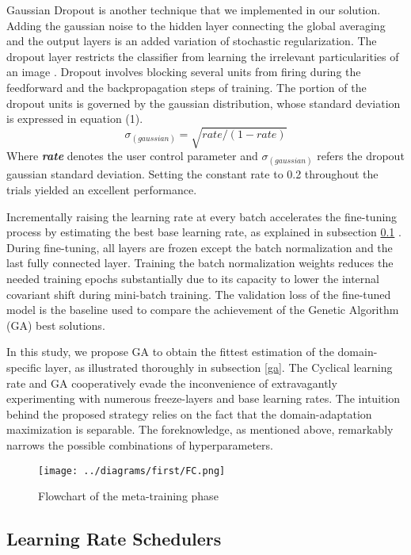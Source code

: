 \documentclass[a4paper, 12 pt, conference]{ieeeconf}
\begin{document}
\quad Gaussian Dropout is another technique that we implemented in our solution. Adding the gaussian noise to the hidden layer connecting the global averaging and the output layers is an added variation of stochastic regularization. The dropout layer restricts the classifier from learning the irrelevant particularities of an image \cite{Srivastava2014}.  Dropout involves blocking several units from firing during the feedforward and the backpropagation steps of training. The portion of the dropout units is governed by the gaussian distribution, whose standard deviation is expressed in equation (1).
\begin{equation} \label{gaus}
\sigma _(gaussian)= \sqrt{rate/(1 - rate)}
\end{equation}
	Where \textbf{\textit{rate}} denotes the user control parameter and \(\sigma _(gaussian)\) refers the dropout gaussian standard deviation. Setting the constant rate to 0.2 throughout the trials yielded an excellent performance.

\quad	Incrementally raising the learning rate at every batch accelerates the fine-tuning process by estimating the best base learning rate, as explained in subsection \ref{lrs} \cite{Smith2017a}. During fine-tuning, all layers are frozen except the batch normalization and the last fully connected layer. Training the batch normalization weights reduces the needed training epochs substantially due to its capacity to lower the internal covariant shift during mini-batch training\cite{Ioffe2015a}. The validation loss of the fine-tuned model is the baseline used to compare the achievement of the Genetic Algorithm (GA) best solutions.

\quad	In this study, we propose GA to obtain the fittest estimation of the domain-specific layer, as illustrated thoroughly in subsection \ref{ga}. The Cyclical learning rate and GA cooperatively evade the inconvenience of extravagantly experimenting with numerous freeze-layers and base learning rates. The intuition behind the proposed strategy relies on the fact that the domain-adaptation maximization is separable. The foreknowledge, as mentioned above, remarkably narrows the possible combinations of hyperparameters.

\begin{figure}[htbp]
\centering
\texttt{[image: ../diagrams/first/FC.png]}
\caption{ Flowchart of the meta-training phase}
\label{meta}
\end{figure}

\subsection{Learning Rate Schedulers} \label{lrs}
\end{document}

